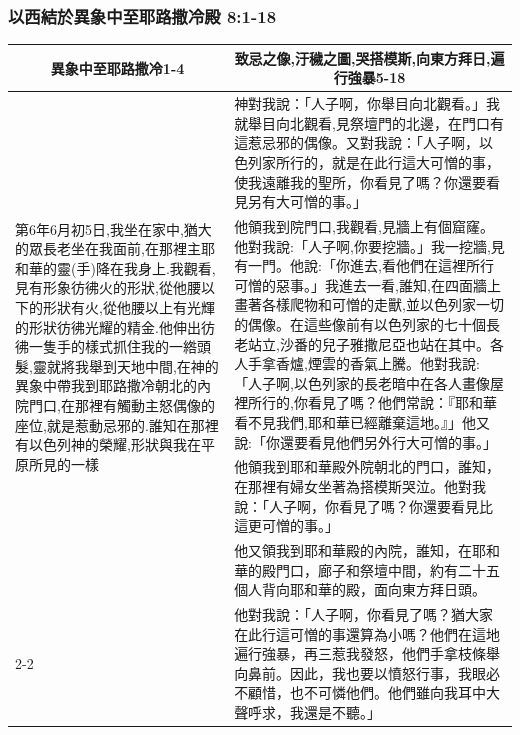 \subsubsection{以西結於異象中至耶路撒冷殿 8:1-18}
\begin{table}[H]
\centering
\begin{tabular}{p{}|p{13.50cm}}\hline\hline
\multicolumn{1}{c|}{異象中至耶路撒冷1-4}&\multicolumn{1}{c}{致忌之像,汙穢之圖,哭搭模斯,向東方拜日,遍行強暴5-18}\\\hline
\multirow{4}{4.25cm}{第6年6月初5日,我坐在家中,猶大的眾長老坐在我面前,在那裡主耶和華的靈(手)降在我身上.我觀看,見有形象彷彿火的形狀,從他腰以下的形狀有火,從他腰以上有光輝的形狀彷彿光耀的精金.他伸出彷彿一隻手的樣式抓住我的一綹頭髮,靈就將我舉到天地中間,在神的異象中帶我到耶路撒冷朝北的內院門口,在那裡有觸動主怒偶像的座位,就是惹動忌邪的.誰知在那裡有以色列神的榮耀,形狀與我在平原所見的一樣}
&神對我說：「人子啊，你舉目向北觀看。」我就舉目向北觀看,見祭壇門的北邊，在門口有這惹忌邪的偶像。又對我說：「人子啊，以色列家所行的，就是在此行這大可憎的事，使我遠離我的聖所，你看見了嗎？你還要看見另有大可憎的事。」
\\\cline{2-2}
&他領我到院門口,我觀看,見牆上有個窟窿。他對我說:「人子啊,你要挖牆。」我一挖牆,見有一門。他說:「你進去,看他們在這裡所行可憎的惡事。」我進去一看,誰知,在四面牆上畫著各樣爬物和可憎的走獸,並以色列家一切的偶像。在這些像前有以色列家的七十個長老站立,沙番的兒子雅撒尼亞也站在其中。各人手拿香爐,煙雲的香氣上騰。他對我說:「人子啊,以色列家的長老暗中在各人畫像屋裡所行的,你看見了嗎？他們常說：『耶和華看不見我們,耶和華已經離棄這地。』」他又說:「你還要看見他們另外行大可憎的事。」\\\cline{2-2}
&他領我到耶和華殿外院朝北的門口，誰知，在那裡有婦女坐著為搭模斯哭泣。他對我說：「人子啊，你看見了嗎？你還要看見比這更可憎的事。」\\\cline{2-2}
&他又領我到耶和華殿的內院，誰知，在耶和華的殿門口，廊子和祭壇中間，約有二十五個人背向耶和華的殿，面向東方拜日頭。\\\cline{2-2}
&他對我說：「人子啊，你看見了嗎？猶大家在此行這可憎的事還算為小嗎？他們在這地遍行強暴，再三惹我發怒，他們手拿枝條舉向鼻前。因此，我也要以憤怒行事，我眼必不顧惜，也不可憐他們。他們雖向我耳中大聲呼求，我還是不聽。」\\\hline
\end{tabular}
\end{table}
